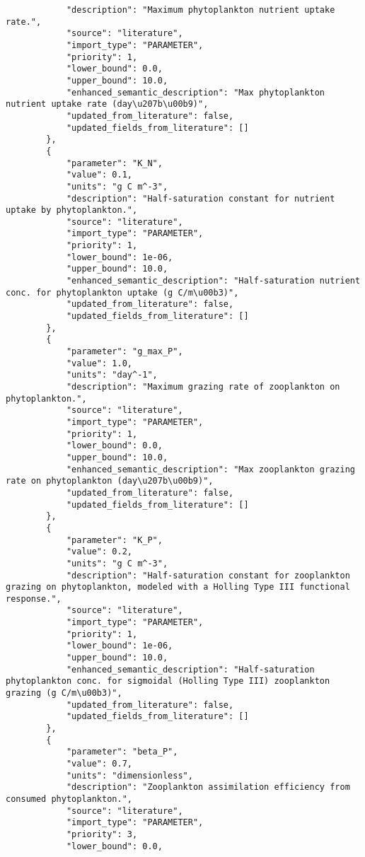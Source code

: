\begin{lstlisting}
            "description": "Maximum phytoplankton nutrient uptake rate.",
            "source": "literature",
            "import_type": "PARAMETER",
            "priority": 1,
            "lower_bound": 0.0,
            "upper_bound": 10.0,
            "enhanced_semantic_description": "Max phytoplankton nutrient uptake rate (day\u207b\u00b9)",
            "updated_from_literature": false,
            "updated_fields_from_literature": []
        },
        {
            "parameter": "K_N",
            "value": 0.1,
            "units": "g C m^-3",
            "description": "Half-saturation constant for nutrient uptake by phytoplankton.",
            "source": "literature",
            "import_type": "PARAMETER",
            "priority": 1,
            "lower_bound": 1e-06,
            "upper_bound": 10.0,
            "enhanced_semantic_description": "Half-saturation nutrient conc. for phytoplankton uptake (g C/m\u00b3)",
            "updated_from_literature": false,
            "updated_fields_from_literature": []
        },
        {
            "parameter": "g_max_P",
            "value": 1.0,
            "units": "day^-1",
            "description": "Maximum grazing rate of zooplankton on phytoplankton.",
            "source": "literature",
            "import_type": "PARAMETER",
            "priority": 1,
            "lower_bound": 0.0,
            "upper_bound": 10.0,
            "enhanced_semantic_description": "Max zooplankton grazing rate on phytoplankton (day\u207b\u00b9)",
            "updated_from_literature": false,
            "updated_fields_from_literature": []
        },
        {
            "parameter": "K_P",
            "value": 0.2,
            "units": "g C m^-3",
            "description": "Half-saturation constant for zooplankton grazing on phytoplankton, modeled with a Holling Type III functional response.",
            "source": "literature",
            "import_type": "PARAMETER",
            "priority": 1,
            "lower_bound": 1e-06,
            "upper_bound": 10.0,
            "enhanced_semantic_description": "Half-saturation phytoplankton conc. for sigmoidal (Holling Type III) zooplankton grazing (g C/m\u00b3)",
            "updated_from_literature": false,
            "updated_fields_from_literature": []
        },
        {
            "parameter": "beta_P",
            "value": 0.7,
            "units": "dimensionless",
            "description": "Zooplankton assimilation efficiency from consumed phytoplankton.",
            "source": "literature",
            "import_type": "PARAMETER",
            "priority": 3,
            "lower_bound": 0.0,

\end{lstlisting}
